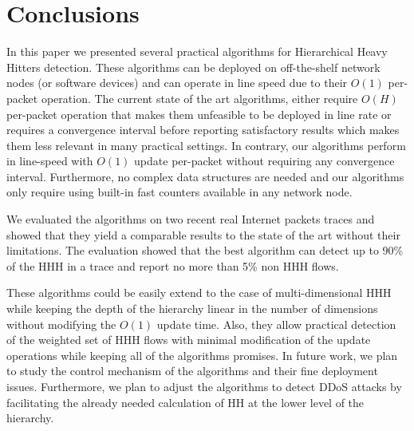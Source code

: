 \section{Conclusions}
In this paper we presented several practical algorithms for  Hierarchical Heavy Hitters detection.  These algorithms can be deployed on off-the-shelf network nodes (or software devices) and can operate in line speed due to their $O(1)$ per-packet operation. The current state of the art algorithms, either require $O(H)$ per-packet operation that makes them unfeasible to be deployed in line rate or requires a convergence interval before reporting satisfactory results which makes them less relevant in many practical settings. In contrary, our algorithms perform in line-speed with $O(1)$ update per-packet without requiring any convergence interval. Furthermore, no complex data structures are needed and our algorithms only require using built-in fast counters available in any network node.

We evaluated the algorithms on two recent real Internet packets traces and showed that they yield a comparable results to the state of the art without their limitations. The evaluation showed that the best algorithm can detect up to 90\% of the HHH in a trace and report no more than 5\% non HHH flows.

These algorithms could be easily extend to the case of multi-dimensional HHH while keeping the depth of the hierarchy linear in the number of dimensions without modifying the $O(1)$ update time. Also, they allow practical detection of the weighted set of HHH flows with minimal modification of the update operations while keeping all of the algorithms promises.
In future work, we plan to study the control mechanism of the algorithms and their fine deployment issues. Furthermore, we plan to adjust the algorithms to detect DDoS attacks by facilitating the already needed calculation of HH at the lower level of the hierarchy.
